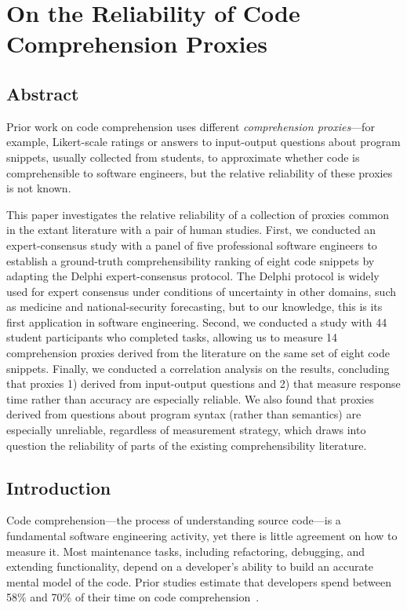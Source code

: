 \section{On the Reliability of Code Comprehension Proxies}
\label{ase}

\subsection{Abstract}
Prior work on code comprehension uses different \emph{comprehension proxies}---for example,
Likert-scale ratings or answers to input-output questions about program snippets, usually collected from students, to
approximate whether code is comprehensible to software engineers, but the relative reliability of these proxies
is not known.

This paper investigates the relative reliability of a collection of proxies common in the extant literature
with a pair of human studies.
First, we conducted an expert-consensus study with a panel of five professional software engineers to establish a
ground-truth comprehensibility ranking of eight code snippets by adapting the Delphi expert-consensus protocol.
The Delphi protocol is widely used for expert consensus under conditions of uncertainty in other domains, such as
medicine and national-security forecasting, but to our knowledge, this is its first application in software engineering.
Second, we conducted a study with 44 student participants who completed tasks, allowing us to measure 14
comprehension proxies derived from the literature on the same set of eight code snippets.
Finally, we conducted a correlation analysis on the results, concluding that proxies
1) derived from input-output questions and
2) that measure response time rather than accuracy are especially reliable.
We also found that proxies derived from questions about program syntax (rather than semantics)
are especially unreliable, regardless of measurement strategy, which draws into question the reliability of parts of the existing
comprehensibility literature.


\subsection{Introduction}
\label{sec:intro}


Code comprehension---the process of understanding source code---is a fundamental software engineering activity, yet there is little agreement on how to measure it. Most maintenance tasks, including refactoring, debugging, and extending functionality, depend on a developer’s ability to build an accurate mental model of the code. Prior studies estimate that developers spend between 58\% and 70\% of their time on code comprehension~\cite{percent1,scalabrino2017automatically}.


